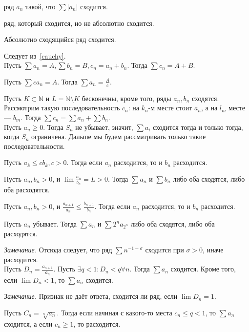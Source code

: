 \documentclass[12pt,a4paper]{article}
\begin{document}
 ряд $a_n$ такой, что $\sum|a_n|$ сходится.

 ряд, который сходится, но не абсолютно сходится.

\lemma Абсолютно сходящийся ряд сходится.

\proof Следует из~\ref{cauchy}.\QEDA\\

\lemma Пусть $\sum a_n=A,\sum b_n=B,c_n=a_n+b_n$. Тогда $\sum c_n=A+B$.

\lemma Пусть $\sum ca_n=A$. Тогда $\sum a_n=\frac{A}{c}$.

\lemma Пусть $K\subset \mathbb N$ и $L=\mathbb N\setminus K$ бесконечны, кроме того, ряды $a_n,b_n$ сходятся. Рассмотрим такую последовательность $c_n$: на $k_n$-м месте стоит $a_n$, а на $l_m$ месте --- $b_m$. Тогда $\sum c_n=\sum a_n+\sum b_n$.\\

Пусть $a_n\geq 0$. Тогда $S_n$ не убывает, значит, $\sum a_i$ сходится тогда и только тогда, когда $S_n$ ограничена. Дальше мы будем рассматривать только такие последовательности.

\lemma Пусть $a_k\leq cb_k,c>0$. Тогда если $a_n$ расходится, то и $b_n$ расходится.

\lemma Пусть $a_n,b_n>0$, и $\lim \frac{a_n}{b_n}=L>0$. Тогда $\sum a_n$ и $\sum b_n$ либо оба сходятся, либо оба расходятся.

\lemma Пусть $a_n,b_n>0$, и $\frac{a_{n+1}}{a_n}\leq \frac{b_{n+1}}{b_n}$. Тогда если $a_n$ расходится, то и $b_n$ расходится.

\lemma Пусть $a_n$ убывает. Тогда $\sum a_n$ и $\sum 2^na_{2^n}$ либо оба сходятся, либо оба расходятся.

\textit{Замечание.} Отсюда следует, что ряд $\sum n^{-1-\sigma}$ сходится при $\sigma>0$, иначе расходится.\\

 Пусть $D_n=\frac{a_{n+1}}{a_n}$. Пусть $\exists q<1:D_n<q\forall n$. Тогда $\sum a_n$ сходится. Кроме того, если $\lim D_n<1$, то $\sum a_n$ сходится.\label{dalamber}

\textit{Замечание.} Признак не даёт ответа, сходится ли ряд, если $\lim D_n=1$.

\lemma Пусть $C_n=\sqrt[n]{a_n}$. Тогда если начиная с какого-то места $c_n\leq q<1$, то $\sum a_n$ сходится, а если $c_n\geq 1$, то расходится.\\

\end{document}
